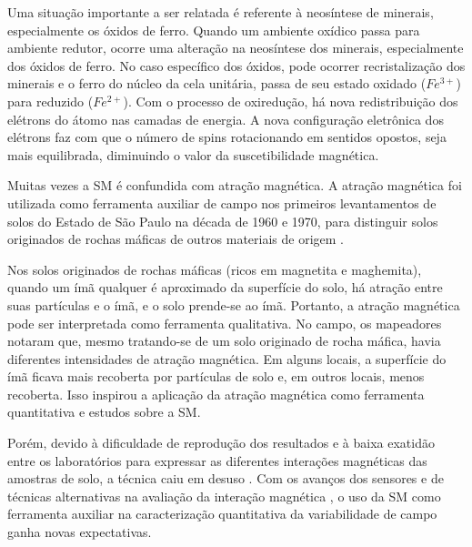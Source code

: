 Uma situação importante a ser relatada é referente à neosíntese de minerais, especialmente os óxidos de ferro. Quando um ambiente oxídico passa para ambiente redutor, ocorre uma alteração na neosíntese dos minerais, especialmente dos óxidos de ferro. No caso específico dos óxidos, pode ocorrer recristalização dos minerais e o ferro do núcleo da cela unitária, passa de seu estado oxidado ($Fe^{3+}$) para reduzido ($Fe^{2+}$). Com o processo de oxiredução, há nova redistribuição dos elétrons do átomo nas camadas de energia. A nova configuração eletrônica dos elétrons faz com que o número de spins rotacionando em sentidos opostos, seja mais equilibrada, diminuindo o valor da suscetibilidade magnética.




Muitas vezes a SM é confundida com atração magnética. A atração magnética foi utilizada como ferramenta auxiliar de campo nos primeiros levantamentos de solos do Estado de São Paulo na década de 1960 e 1970, para distinguir solos originados de rochas máficas de outros materiais de origem \citep{resende:1988}.




Nos solos originados de rochas máficas (ricos em magnetita e maghemita), quando um ímã qualquer é aproximado da superfície do solo, há atração entre suas partículas e o ímã, e o solo prende-se ao ímã. Portanto, a atração magnética pode ser interpretada como ferramenta qualitativa. No campo, os mapeadores notaram que, mesmo tratando-se de um solo originado de rocha máfica, havia diferentes intensidades de atração magnética. Em alguns locais, a superfície do ímã ficava mais recoberta por partículas de solo e, em outros locais, menos recoberta. Isso inspirou a aplicação da atração magnética como ferramenta quantitativa e estudos sobre a SM.




Porém, devido à dificuldade de reprodução dos resultados e à baixa exatidão entre os laboratórios para expressar as diferentes interações magnéticas das amostras de solo, a técnica caiu em desuso \citep{resende:1988}. Com os avanços dos sensores e de técnicas alternativas na avaliação da interação magnética \citep{carneiro:2003}, o uso da SM como ferramenta auxiliar na caracterização quantitativa da variabilidade de campo \citep{santos:2013} ganha novas expectativas.




